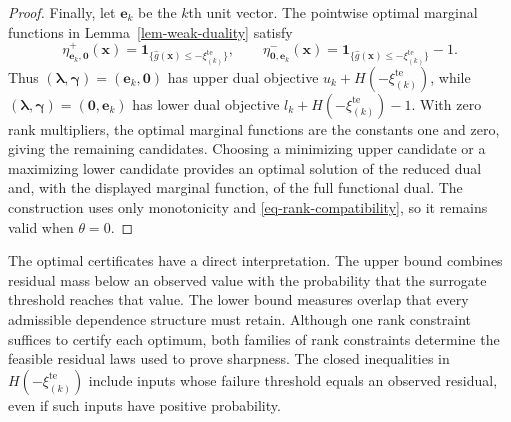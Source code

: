 \documentclass[review,11pt,3p,authoryear,nopreprintline]{elsarticle}
\begin{document}
\begin{proof}
  Finally, let $\bm e_k$ be the $k$th unit vector. The pointwise optimal marginal functions in Lemma~\ref{lem-weak-duality} satisfy
  \begin{equation}
    \eta^+_{\bm e_k,\bm0}(\bm x)
    =\mathbf1_{\{\hat g(\bm x)\le-\xi_{(k)}^{\mathrm{te}}\}},
    \qquad
    \eta^-_{\bm0,\bm e_k}(\bm x)
    =\mathbf1_{\{\hat g(\bm x)\le-\xi_{(k)}^{\mathrm{te}}\}}-1.
    \label{eq-optimal-threshold-functions}
  \end{equation}
  Thus $(\bm\lambda,\bm\gamma)=(\bm e_k,\bm0)$ has upper dual objective $u_k+H\left(-\xi_{(k)}^{\mathrm{te}}\right)$, while $(\bm\lambda,\bm\gamma)=(\bm0,\bm e_k)$ has lower dual objective $l_k+H\left(-\xi_{(k)}^{\mathrm{te}}\right)-1$. With zero rank multipliers, the optimal marginal functions are the constants one and zero, giving the remaining candidates. Choosing a minimizing upper candidate or a maximizing lower candidate provides an optimal solution of the reduced dual and, with the displayed marginal function, of the full functional dual. The construction uses only monotonicity and \eqref{eq-rank-compatibility}, so it remains valid when $\theta=0$.
\end{proof}

The optimal certificates have a direct interpretation. The upper bound combines residual mass below an observed value with the probability that the surrogate threshold reaches that value. The lower bound measures overlap that every admissible dependence structure must retain. Although one rank constraint suffices to certify each optimum, both families of rank constraints determine the feasible residual laws used to prove sharpness. The closed inequalities in $H\left(-\xi_{(k)}^{\mathrm{te}}\right)$ include inputs whose failure threshold equals an observed residual, even if such inputs have positive probability.
\end{document}
